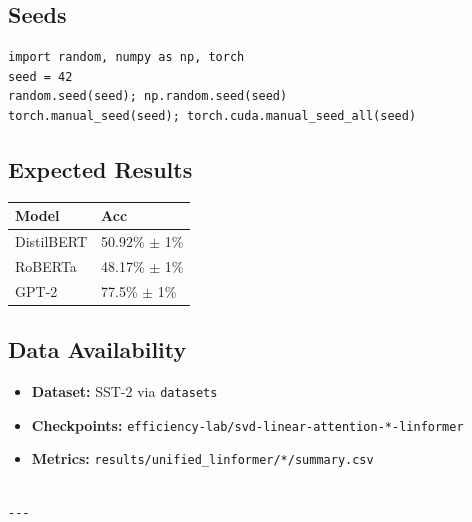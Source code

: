 \subsection{Seeds}

\begin{lstlisting}
import random, numpy as np, torch
seed = 42
random.seed(seed); np.random.seed(seed)
torch.manual_seed(seed); torch.cuda.manual_seed_all(seed)
\end{lstlisting}

\subsection{Expected Results}

\begin{table}[H]
\centering
\small
\begin{tabular}{ll}
\toprule
\textbf{Model} & \textbf{Acc} \\
\midrule
DistilBERT & 50.92\% $\pm$ 1\% \\
RoBERTa & 48.17\% $\pm$ 1\% \\
GPT-2 & 77.5\% $\pm$ 1\% \\
\bottomrule
\end{tabular}
\end{table}

\subsection{Data Availability}

\begin{itemize}
\item \textbf{Dataset:} SST-2 via \texttt{datasets}
\item \textbf{Checkpoints:} \texttt{efficiency-lab/svd-linear-attention-*-linformer}
\item \textbf{Metrics:} \texttt{results/unified\_linformer/*/summary.csv}
\end{itemize}
\begin{lstlisting}

---
\end{lstlisting}